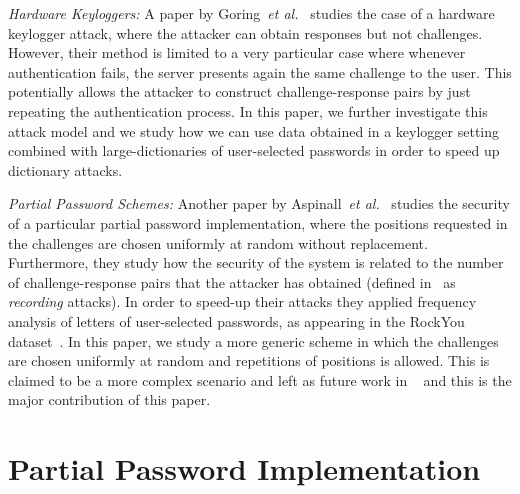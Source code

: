 \documentclass{llncs}
\begin{document}
\textit{Hardware Keyloggers:}
A paper by Goring~\textit{et al.}~\cite{CSGoring} studies the case of
a hardware keylogger attack, where the attacker can obtain responses
but not challenges. However, their method is limited to a very particular
case where whenever authentication fails, the server presents again
the same challenge to the user. This potentially allows the attacker
to construct challenge-response pairs by just repeating the authentication process.
In this paper, we further investigate this attack model and we study how we can
use data obtained in a keylogger setting combined with large-dictionaries of 
user-selected passwords in order to
speed up dictionary attacks.

\textit{Partial Password Schemes:}
Another paper by
Aspinall~\textit{et al.}~\cite{FC13paper} studies the
security of a particular partial password implementation,
where the positions requested in the challenges are chosen uniformly at random
without replacement. Furthermore, they study how the security of the system
is related to the number
of challenge-response pairs that the attacker has obtained
(defined in~\cite{FC13paper} as \textit{recording} attacks).
In order to speed-up their attacks they applied frequency analysis of letters of user-selected 
passwords, as appearing in the RockYou dataset~\cite{dataset}. In this paper, we study
a more generic scheme in which the challenges are chosen uniformly at
random and repetitions of positions is allowed. This is claimed to be a more
complex scenario and left as future work in ~\cite{FC13paper} and this is the major contribution of 
this paper.





\section{Partial Password Implementation}\label{sec3}
\end{document}
